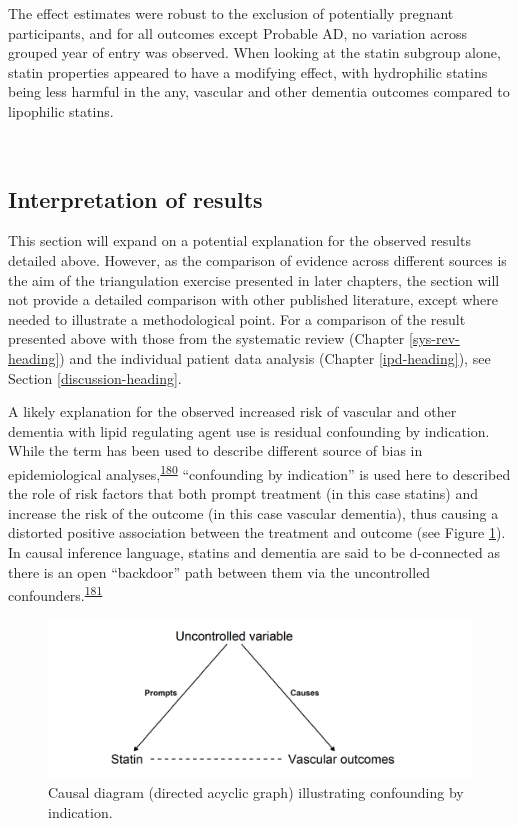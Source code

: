 \documentclass[a4paper, twoside]{templates/ociamthesis}
\begin{document}
The effect estimates were robust to the exclusion of potentially pregnant participants, and for all outcomes except Probable AD, no variation across grouped year of entry was observed. When looking at the statin subgroup alone, statin properties appeared to have a modifying effect, with hydrophilic statins being less harmful in the any, vascular and other dementia outcomes compared to lipophilic statins.

~

\hypertarget{interpretation-of-results}{%
\subsection{Interpretation of results}\label{interpretation-of-results}}

This section will expand on a potential explanation for the observed results detailed above. However, as the comparison of evidence across different sources is the aim of the triangulation exercise presented in later chapters, the section will not provide a detailed comparison with other published literature, except where needed to illustrate a methodological point. For a comparison of the result presented above with those from the systematic review (Chapter \ref{sys-rev-heading}) and the individual patient data analysis (Chapter \ref{ipd-heading}), see Section \ref{discussion-heading}.

A likely explanation for the observed increased risk of vascular and other dementia with lipid regulating agent use is residual confounding by indication. While the term has been used to describe different source of bias in epidemiological analyses,\textsuperscript{\protect\hyperlink{ref-salas1999}{180}} ``confounding by indication'' is used here to described the role of risk factors that both prompt treatment (in this case statins) and increase the risk of the outcome (in this case vascular dementia), thus causing a distorted positive association between the treatment and outcome (see Figure \ref{fig:indicationBias}). In causal inference language, statins and dementia are said to be d-connected as there is an open ``backdoor'' path between them via the uncontrolled confounders.\textsuperscript{\protect\hyperlink{ref-suttorp2015}{181}}





\begin{figure}[H]
\includegraphics[width=1\linewidth]{figures/cprd-analysis/indicationBias} \caption[Confounding by indication causal diagram]{Causal diagram (directed acyclic graph) illustrating confounding by indication.}\label{fig:indicationBias}
\end{figure}
\end{document}
